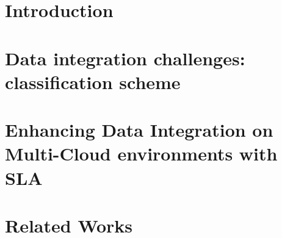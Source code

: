 \documentclass{llncs}
\begin{document}
%



\section{Introduction}
\label{sec:intro}
 
 
\section{Data integration challenges: classification scheme}\label{sec:sm}


\section{Enhancing  Data Integration on Multi-Cloud environments with SLA}\label{sec:approach}

\section{Related Works}\label{sec:rw}


\end{document}

